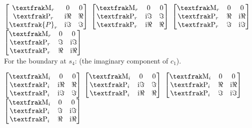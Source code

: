 \documentclass[]{iucr}              %
\numberwithin{equation}{section}
\begin{document}
	$\begin{bmatrix}
		\Minus{}_r		& 0					& 0 \\
		\Plus{}_r		&  \textrm{i}\Re{}	& \Re{} \\
		\textfrak{P}_r	& \textrm{i}\Im{}	& \Im{}
	\end{bmatrix}$
	$\begin{bmatrix}
		\Minus{}_r	& 0 				& 0 \\
		\Plus{}_r	&\textrm{i}\Im{}	& \Im{} \\
		\Plus{}_r	& \textrm{i}\Re{}	& \Re{} \\
	\end{bmatrix}$ 
	$\begin{bmatrix}
		\label{thirdmatrix}
		\Minus{}_r	& 0			& 0 \\
		\Plus{}_r	&  \Re{}	& \textrm{i}\Re{} \\
		\Plus{}_r	& \Im{}		&\textrm{i}\Im{}
	\end{bmatrix}	$
	$\begin{bmatrix}
		\Minus{}_r	& 0			& 0 \\
		\Plus{}_r	& \Im{}		&\textrm{i}\Im{} \\
		\Plus{}_r	&  \Re{}	&\textrm{i}\Re{} \\
	\end{bmatrix}$ \\
	
	For the boundary at $s_4$: (the imaginary component of $c_1$).
	
	$\begin{bmatrix}
		\Minus{}_i	& 0					& 0 \\
		\Plus{}_i	&  \textrm{i}\Re{}	& \Re{} \\
		\Plus{}_i	& \textrm{i}\Im{}	& \Im{}
	\end{bmatrix}$
	$\begin{bmatrix}
		\Minus{}_i	& 0					& 0 \\
		\Plus{}_i	& \textrm{i}\Im{}	& \Im{} \\
		\Plus{}_i	&  \textrm{i}\Re{}	& \Re{} \\
	\end{bmatrix}$ 
	$\begin{bmatrix}
		\Minus{}_i	& 0			& 0 \\
		\Plus{}_i	&  \Re{}	& \textrm{i}\Re{} \\
		\Plus{}_i	& \Im{}		& \textrm{i}\Im{}
	\end{bmatrix}	$
	$\begin{bmatrix}
		\Minus{}_i	& 0		& 0 \\
		\Plus{}_i	& \Im{}	& \textrm{i}\Im{} \\
		\Plus{}_i	&  \Re{}& \textrm{i}\Re{} \\
	\end{bmatrix}$ \\
	
\end{document}
